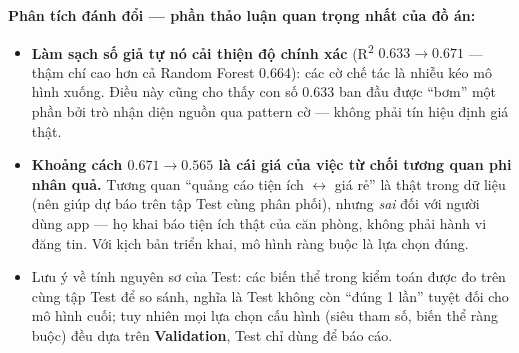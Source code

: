 \textbf{Phân tích đánh đổi — phần thảo luận quan trọng nhất của đồ án:}
\begin{itemize}[leftmargin=*, itemsep=3pt]
  \item \textbf{Làm sạch số giả tự nó cải thiện độ chính xác} (R\textsuperscript{2}
        $0.633 \to 0.671$ — thậm chí cao hơn cả Random Forest 0.664): các cờ chế tác là
        nhiễu kéo mô hình xuống. Điều này cũng cho thấy con số 0.633 ban đầu được ``bơm''
        một phần bởi trò nhận diện nguồn qua pattern cờ — không phải tín hiệu định giá thật.
  \item \textbf{Khoảng cách $0.671 \to 0.565$ là cái giá của việc từ chối tương quan
        phi nhân quả.} Tương quan ``quảng cáo tiện ích $\leftrightarrow$ giá rẻ'' là thật
        trong dữ liệu (nên giúp dự báo trên tập Test cùng phân phối), nhưng \textit{sai}
        đối với người dùng app — họ khai báo tiện ích thật của căn phòng, không phải
        hành vi đăng tin. Với kịch bản triển khai, mô hình ràng buộc là lựa chọn đúng.
  \item Lưu ý về tính nguyên sơ của Test: các biến thể trong kiểm toán được đo trên
        cùng tập Test để so sánh, nghĩa là Test không còn ``đúng 1 lần'' tuyệt đối
        cho mô hình cuối; tuy nhiên mọi lựa chọn cấu hình (siêu tham số, biến thể
        ràng buộc) đều dựa trên \textbf{Validation}, Test chỉ dùng để báo cáo.
\end{itemize}

